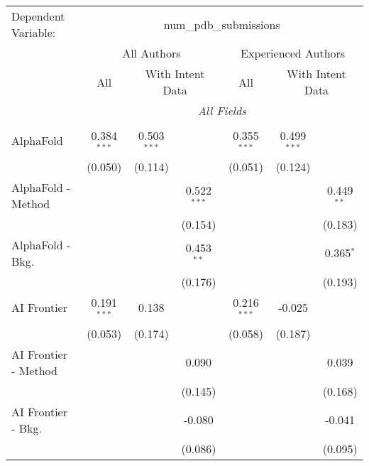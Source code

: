 \begingroup
\centering
\begin{tabular}{lcccccc}
   \tabularnewline \midrule \midrule
   Dependent Variable: & \multicolumn{6}{c}{num\_pdb\_submissions}\\
 & \multicolumn{3}{c}{All Authors} & \multicolumn{3}{c}{Experienced Authors} \\
\cmidrule(lr){2-4} \cmidrule(lr){5-7}
 & \multicolumn{1}{c}{All} & \multicolumn{2}{c}{With Intent Data} & \multicolumn{1}{c}{All} & \multicolumn{2}{c}{With Intent Data} \\
\cmidrule(lr){2-2} \cmidrule(lr){3-4} \cmidrule(lr){5-5} \cmidrule(lr){6-7}
 & \multicolumn{6}{c}{\textit{All Fields}} \\ \\
   AlphaFold            & 0.384$^{***}$ & 0.503$^{***}$ &               & 0.355$^{***}$ & 0.499$^{***}$ &   \\   
                        & (0.050)       & (0.114)       &               & (0.051)       & (0.124)       &   \\   
   AlphaFold - Method   &               &               & 0.522$^{***}$ &               &               & 0.449$^{**}$\\   
                        &               &               & (0.154)       &               &               & (0.183)\\   
   AlphaFold - Bkg.     &               &               & 0.453$^{**}$  &               &               & 0.365$^{*}$\\   
                        &               &               & (0.176)       &               &               & (0.193)\\   
   AI Frontier          & 0.191$^{***}$ & 0.138         &               & 0.216$^{***}$ & -0.025        &   \\   
                        & (0.053)       & (0.174)       &               & (0.058)       & (0.187)       &   \\   
   AI Frontier - Method &               &               & 0.090         &               &               & 0.039\\   
                        &               &               & (0.145)       &               &               & (0.168)\\   
   AI Frontier - Bkg.   &               &               & -0.080        &               &               & -0.041\\   
                        &               &               & (0.086)       &               &               & (0.095)\\   

\end{tabular}
